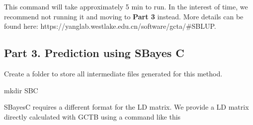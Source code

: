 \documentclass[
  letterpaper,
  DIV=11,
  numbers=noendperiod]{scrartcl}
\newenvironment{Shaded}{\begin{snugshade}}{\end{snugshade}}
\newcommand{\AttributeTok}[1]{\textcolor[rgb]{0.40,0.45,0.13}{#1}}
\newcommand{\ControlFlowTok}[1]{\textcolor[rgb]{0.00,0.23,0.31}{\textbf{#1}}}
\newcommand{\DataTypeTok}[1]{\textcolor[rgb]{0.68,0.00,0.00}{#1}}
\newcommand{\FunctionTok}[1]{\textcolor[rgb]{0.28,0.35,0.67}{#1}}
\newcommand{\KeywordTok}[1]{\textcolor[rgb]{0.00,0.23,0.31}{\textbf{#1}}}
\newcommand{\NormalTok}[1]{\textcolor[rgb]{0.00,0.23,0.31}{#1}}
\newcommand{\OperatorTok}[1]{\textcolor[rgb]{0.37,0.37,0.37}{#1}}
\newcommand{\VariableTok}[1]{\textcolor[rgb]{0.07,0.07,0.07}{#1}}
\begin{document}
\begin{Shaded}
\end{Shaded}

This command will take approximately 5 min to run. In the interest of
time, we recommend not running it and moving to \textbf{Part 3} instead.
More details can be found here:
https://yanglab.westlake.edu.cn/software/gcta/\#SBLUP.

\subsection{Part 3. Prediction using SBayes
C}\label{part-3.-prediction-using-sbayes-c}

Create a folder to store all intermediate files generated for this
method.

\begin{Shaded}
\begin{Highlighting}[]
\FunctionTok{mkdir}\NormalTok{ SBC}
\end{Highlighting}
\end{Shaded}

SBayesC requires a different format for the LD matrix. We provide a LD
matrix directly calculated with GCTB using a command like this

\begin{Shaded}
\end{Shaded}
\end{document}
